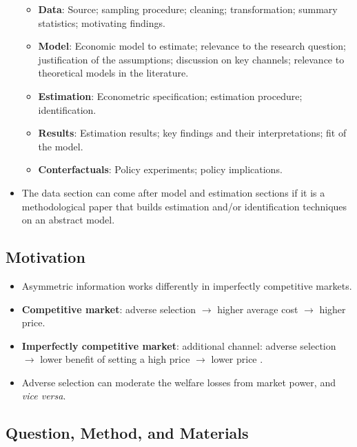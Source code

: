 \documentclass[]{book}
\providecommand{\tightlist}{%
  \setlength{\itemsep}{0pt}\setlength{\parskip}{0pt}}
\begin{document}
\begin{itemize}
  \begin{itemize}
  \tightlist
  \item
    \textbf{Data}: Source; sampling procedure; cleaning; transformation;
    summary statistics; motivating findings.
  \item
    \textbf{Model}: Economic model to estimate; relevance to the
    research question; justification of the assumptions; discussion on
    key channels; relevance to theoretical models in the literature.
  \item
    \textbf{Estimation}: Econometric specification; estimation
    procedure; identification.
  \item
    \textbf{Results}: Estimation results; key findings and their
    interpretations; fit of the model.
  \item
    \textbf{Conterfactuals}: Policy experiments; policy implications.
  \end{itemize}
\item
  The data section can come after model and estimation sections if it is
  a methodological paper that builds estimation and/or identification
  techniques on an abstract model.
\end{itemize}

\subsection{Motivation}\label{motivation}

\begin{itemize}
\tightlist
\item
  Asymmetric information works differently in imperfectly competitive
  markets.
\item
  \textbf{Competitive market}: adverse selection \(\to\) higher average
  cost \(\to\) higher price.
\item
  \textbf{Imperfectly competitive market}: additional channel: adverse
  selection \(\to\) lower benefit of setting a high price \(\to\) lower
  price
  \citep{mahoneyImperfectCompetitionSelection2017, lesterScreeningAdverseSelection2018}.
\item
  Adverse selection can moderate the welfare losses from market power,
  and \emph{vice versa}.
\end{itemize}

\subsection{Question, Method, and
Materials}\label{question-method-and-materials}
\end{document}

